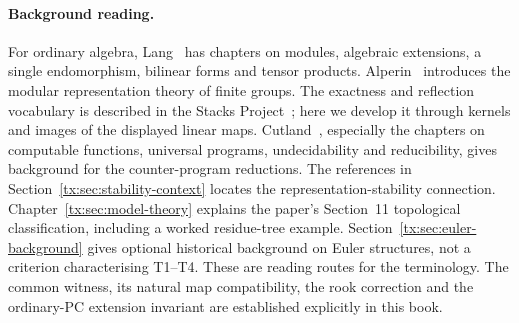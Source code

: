 \documentclass[11pt,a4paper,oneside,openany]{book}
\theoremstyle{definition}\newtheorem{definition}[theorem]{Definition}
\theoremstyle{remark}\newtheorem{remark}[theorem]{Remark}
\numberwithin{equation}{chapter}
\begin{document}
\paragraph{Background reading.}
For ordinary algebra, Lang~\cite{LangAlgebra} has chapters on
modules, algebraic extensions, a single endomorphism, bilinear forms
and tensor products. Alperin~\cite{AlperinLocal} introduces the modular
representation theory of finite groups. The exactness and reflection
vocabulary is described in the Stacks Project~\cite{StacksExact}; here
we develop it through kernels and images of the displayed linear maps.
Cutland~\cite{Cutland}, especially the chapters on computable functions,
universal programs, undecidability and reducibility, gives background
for the counter-program reductions. The references in
Section~\ref{tx:sec:stability-context} locates the representation-stability
connection. Chapter~\ref{tx:sec:model-theory} explains the paper's
Section~11 topological classification, including a worked residue-tree
example. Section~\ref{tx:sec:euler-background} gives optional historical
background on Euler structures, not a criterion characterising T1--T4.
These are reading routes for the terminology. The common witness,
its natural map compatibility, the rook correction and the ordinary-PC
extension invariant are established explicitly in this book.
\end{document}
